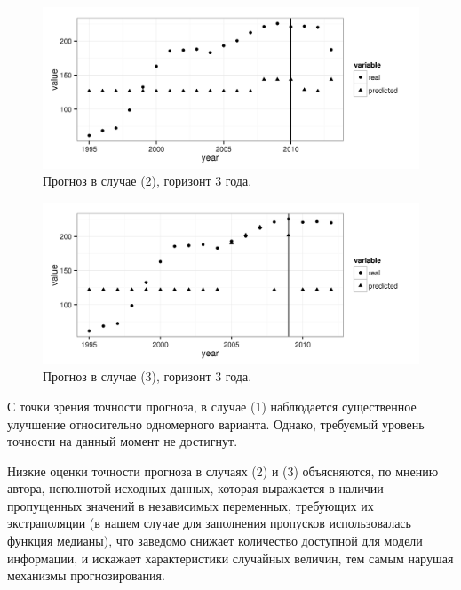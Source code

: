 \begin{figure}[bhtp]
    \begin{center}
        \includegraphics{images/m_plot2.png}
        \caption{Прогноз в случае (2), горизонт 3 года.}		
        \label{figure:m_plot2}
    \end{center}
\end{figure}

\begin{figure}[bhtp]
    \begin{center}
        \includegraphics{images/m_plot3.png}
        \caption{Прогноз в случае (3), горизонт 3 года.}		
        \label{figure:m_plot3}
    \end{center}
\end{figure}

С точки зрения точности прогноза, в случае (1) наблюдается существенное 
улучшение относительно одномерного варианта. 
Однако, требуемый уровень точности на данный момент не 
достигнут.

Низкие оценки точности прогноза в случаях (2) и (3) объясняются, по мнению 
автора, неполнотой исходных данных, которая выражается в наличии пропущенных 
значений в независимых переменных, требующих их экстраполяции (в нашем случае 
для заполнения пропусков использовалась функция медианы), что заведомо снижает 
количество доступной для модели информации, и искажает характеристики случайных 
величин, тем самым нарушая механизмы прогнозирования.

